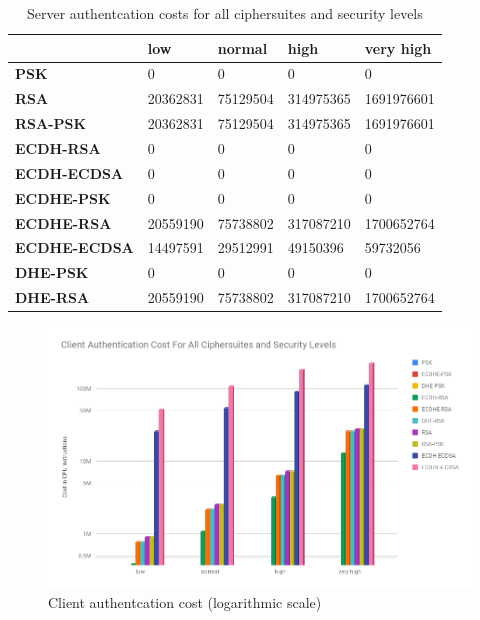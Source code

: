\documentclass{llncs}
\begin{document}
\begin{table}[]
\begin{tabular}{|l|l|l|l|l|}
\hline
                     & \textbf{low} & \textbf{normal} & \textbf{high} & \textbf{very high} \\ \hline
\textbf{PSK}         & 0            & 0               & 0             & 0                  \\ \hline
\textbf{RSA}         & 20362831     & 75129504        & 314975365     & 1691976601         \\ \hline
\textbf{RSA-PSK}     & 20362831     & 75129504        & 314975365     & 1691976601         \\ \hline
\textbf{ECDH-RSA}    & 0            & 0               & 0             & 0                  \\ \hline
\textbf{ECDH-ECDSA}  & 0            & 0               & 0             & 0                  \\ \hline
\textbf{ECDHE-PSK}   & 0            & 0               & 0             & 0                  \\ \hline
\textbf{ECDHE-RSA}   & 20559190     & 75738802        & 317087210     & 1700652764         \\ \hline
\textbf{ECDHE-ECDSA} & 14497591     & 29512991        & 49150396      & 59732056           \\ \hline
\textbf{DHE-PSK}     & 0            & 0               & 0             & 0                  \\ \hline
\textbf{DHE-RSA}     & 20559190     & 75738802        & 317087210     & 1700652764         \\ \hline
\end{tabular}
  \centering \caption{\label{table:tls-auth-cost-server} Server authentcation costs for all ciphersuites and security levels}
\end{table}

\begin{figure}
  \centering
  \includegraphics[width=1.0\textwidth]{img/tls-client-auth-cost.png}
  \centering \caption{\label{fig:tls-auth-cost-client} Client authentcation cost (logarithmic scale)}
\end{figure}
\end{document}
